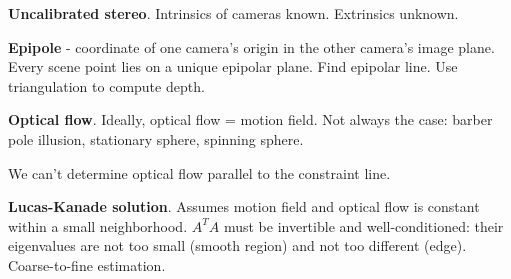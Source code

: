 \documentclass[twocolumn]{zett}
\begin{document}
\begin{node}
  \textbf{Uncalibrated stereo}.
  Intrinsics of cameras known.
  Extrinsics unknown.
\end{node}

\begin{node}
  \textbf{Epipole} - coordinate of one camera's origin in the other camera's image plane.
  Every scene point lies on a unique epipolar plane.
  Find epipolar line.
  Use triangulation to compute depth.
\end{node}

\begin{node}
  \textbf{Optical flow}.
  Ideally, optical flow = motion field.
  Not always the case: barber pole illusion, stationary sphere, spinning sphere.
\end{node}

\begin{node}
  We can't determine optical flow parallel to the constraint line.
\end{node}

\begin{node}
  \textbf{Lucas-Kanade solution}.
  Assumes motion field and optical flow is constant within a small neighborhood.
  $A^{T}A$ must be invertible and well-conditioned: their eigenvalues are not too small (smooth region) and not too different (edge).
  Coarse-to-fine estimation.
\end{node}
\end{document}
